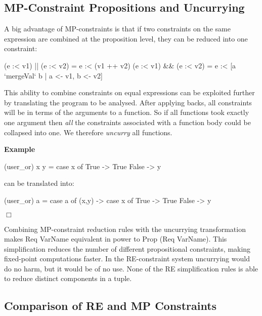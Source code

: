 \documentclass[preprint]{sigplanconf}
\newcommand{\C}[1]{\textsf{#1}}
\newcounter{exmp}
\newcommand{\yesexample}{\addtocounter{exmp}{1}\addvspace{2mm}\noindent\textbf{Example \arabic{exmp}}}
\newcommand{\noexample}{\hfill$\Box$\par\addvspace{2mm}}
\newenvironment{example}{\yesexample}{\noexample}
\begin{document}
\subsection{MP-Constraint Propositions and Uncurrying}

A big advantage of MP-constraints is that if two constraints on the same expression are combined at the proposition level, they can be reduced into one constraint:

\begin{code}
(e :< v1) || (e :< v2) = e :< (v1 ++ v2)
(e :< v1) && (e :< v2) = e :< [a `mergeVal` b | a <- v1, b <- v2]
\end{code}

\noindent This ability to combine constraints on equal expressions can be exploited further by translating the program to be analysed. After applying \C{backs}, all constraints will be in terms of the arguments to a function. So if all functions took exactly one argument then \textit{all} the constraints associated with a function body could be collapsed into one. We therefore \textit{uncurry} all functions.

\begin{example}
\begin{code}
(user_or) x y = case  x of
                      True   -> True
                      False  -> y
\end{code}

\noindent can be translated into:

\begin{code}
(user_or) a = case  a of
                    (x,y) -> case  x of
                                   True    -> True
                                   False   -> y
\end{code}
\end{example}

Combining MP-constraint reduction rules with the uncurrying transformation makes \C{Req VarName} equivalent in power to \C{Prop (Req VarName)}. This simplification reduces the number of different propositional constraints, making fixed-point computations faster. In the RE-constraint system uncurrying would do no harm, but it would be of no use. None of the RE simplification rules is able to reduce distinct components in a tuple.

\subsection{Comparison of RE and MP Constraints}
\end{document}
